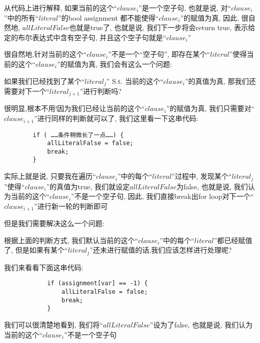         \par
        从代码上进行解释,
        如果当前的这个``$clause_{i}$''是一个空子句,
        也就是说,
        对``$clause_{i}$''中的所有``$literal$''的bool assignment
        都不能使得``$clause_{i}$''的赋值为真,
        因此,
        很自然地,
        $allLiteralFalse$也就是true了,
        也就是说,
        我们下一步将会return true,
        表示给定的布尔表达式中含有空子句,
        并且这个空子句就是``$clause_{i}$''
        \par
        很自然地,针对当前的这个``$clause_{i}$''不是一个``空子句'', 
        即存在某个``$literal$''使得当前的这个``$clause_{i}$''的赋值为真,
        我们会有这么一个问题:
        \par
        如果我们已经找到了某个``$literal_{j}$'' 
        S.t. 当前的这个``$clause_{i}$''的真值为真,
        那我们还需要对下一个``$literal_{j+1}$''进行判断吗?
        \par
        很明显,根本不用!因为我们已经让当前的这个``$clause_{i}$''的赋值为真,
        我们只需要对``$clause_{i+1}$''进行同样的判断就可以了,
        我们这里看一下这串代码:
        \begin{lstlisting}
        if ( ……条件稍微长了一点……) {
            allLiteralFalse = false;
            break;
        }
        \end{lstlisting}
        \par
        实际上就是说,
        只要我在遍历``$clause_{i}$''中的每个``$literal$''过程中,
        发现某个``$literal_{j}$''使得``$clause_{i}$''的真值为true,
        我们就设定$allLiteralFalse$为false,
        也就是说,
        我们认为当前的这个``$clause_{i}$''不是一个空子句,
        因此,
        我们直接break出for loop对下一个``$clause_{i+1}$''进行新一轮的判断即可
        \par
        但是我们需要解决这么一个问题:
        \par
        根据上面的判断方式,
        我们默认当前的这个``$clause_{i}$''中的每个``$literal$''都已经赋值了,
        但是如果有某个``$literal_{j}$''还未进行赋值的话,我们应该怎样进行处理呢?
        \par
        我们来看看下面这串代码:
        \begin{lstlisting}
            if (assignment[var] == -1) {
                allLiteralFalse = false;
                break;
            }
        \end{lstlisting}
        \par
        我们可以很清楚地看到,
        我们将``$allLiteralFalse$''设为了false,
        也就是说,
        我们认为当前的这个``$clause_{i}$''不是一个空子句
